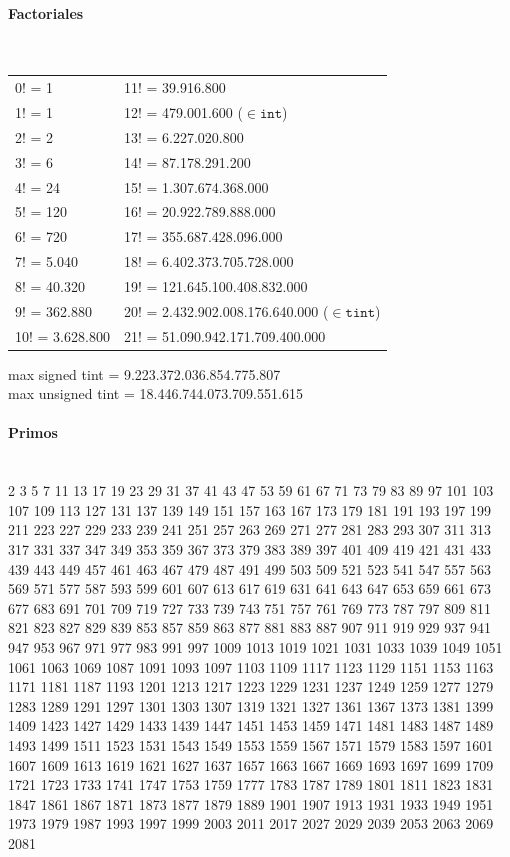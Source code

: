 \paragraph{Factoriales} \ \\
\begin{tabular}{l|l}
0! =	1             & 11! = 39.916.800  \\
1! =	1             & 12! =	479.001.600	($\in \mathtt{int}$)\\
2! =	2             & 13! =	6.227.020.800	\\
3! =	6             & 14! =	87.178.291.200	\\
4! =	24            & 15! =	1.307.674.368.000	\\
5! =	120   			  & 16! =	20.922.789.888.000	\\
6! =	720           & 17! =	355.687.428.096.000	\\
7! =	5.040	        & 18! =	6.402.373.705.728.000	\\
8! =	40.320	      & 19! =	121.645.100.408.832.000	\\
9! =	362.880       & 20! =	2.432.902.008.176.640.000	($\in \mathtt{tint}$) \\
10! =	3.628.800     & 21! =	51.090.942.171.709.400.000
\end{tabular}
 
max signed tint = 9.223.372.036.854.775.807 \\
max unsigned tint = 18.446.744.073.709.551.615
\paragraph{Primos} \ \\
2 3 5 7 11 13 17 19 23 29
31 37 41 43 47 53 59 61 67 71
73 79 83 89 97 101 103 107 109 113
127 131 137 139 149 151 157 163 167 173
179 181 191 193 197 199 211 223 227 229
233 239 241 251 257 263 269 271 277 281
283 293 307 311 313 317 331 337 347 349
353 359 367 373 379 383 389 397 401 409
419 421 431 433 439 443 449 457 461 463
467 479 487 491 499 503 509 521 523 541
547 557 563 569 571 577 587 593 599 601
607 613 617 619 631 641 643 647 653 659
661 673 677 683 691 701 709 719 727 733
739 743 751 757 761 769 773 787 797 809
811 821 823 827 829 839 853 857 859 863
877 881 883 887 907 911 919 929 937 941
947 953 967 971 977 983 991 997 1009 1013
1019 1021 1031 1033 1039 1049 1051 1061 1063 1069
1087 1091 1093 1097 1103 1109 1117 1123 1129 1151
1153 1163 1171 1181 1187 1193 1201 1213 1217 1223
1229 1231 1237 1249 1259 1277 1279 1283 1289 1291
1297 1301 1303 1307 1319 1321 1327 1361 1367 1373
1381 1399 1409 1423 1427 1429 1433 1439 1447 1451
1453 1459 1471 1481 1483 1487 1489 1493 1499 1511
1523 1531 1543 1549 1553 1559 1567 1571 1579 1583
1597 1601 1607 1609 1613 1619 1621 1627 1637 1657
1663 1667 1669 1693 1697 1699 1709 1721 1723 1733
1741 1747 1753 1759 1777 1783 1787 1789 1801 1811
1823 1831 1847 1861 1867 1871 1873 1877 1879 1889
1901 1907 1913 1931 1933 1949 1951 1973 1979 1987
1993 1997 1999 2003 2011 2017 2027 2029 2039 2053
2063 2069 2081
 
